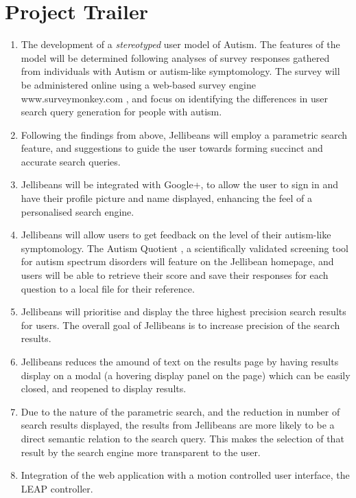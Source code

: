 \documentclass[a4paper, 11pt]{article}
\begin{document}
\section{Project Trailer}
\begin{enumerate}
\item{The development of a \textit{stereotyped} user model of Autism. The features of the model will be determined following analyses of survey responses gathered from individuals with Autism or autism-like symptomology. The survey will be administered online using a web-based survey engine www.surveymonkey.com \cite{surveymonkey}, and focus on identifying the differences in user search query generation for people with autism.}
\item{Following the findings from above, Jellibeans will employ a parametric search feature, and suggestions to guide the user towards forming succinct and accurate search queries.}
\item{Jellibeans will be integrated with Google+, to allow the user to sign in and have their profile picture and name displayed, enhancing the feel of a personalised search engine.}
\item{Jellibeans will allow users to get feedback on the level of their autism-like symptomology. The Autism Quotient \cite{Baron Cohen et al}, a scientifically validated screening tool for autism spectrum disorders will feature on the Jellibean homepage, and users will be able to retrieve their score and save their responses for each question to a local file for their reference.}
\item{Jellibeans will prioritise and display the three highest precision search results for users. The overall goal of Jellibeans is to increase precision of the search results.}
\item{Jellibeans reduces the amound of text on the results page by having results display on a modal (a hovering display panel on the page) which can be easily closed, and reopened to display results.}
\item{Due to the nature of the parametric search, and the reduction in number of search results displayed, the results from Jellibeans are more likely to be a direct semantic relation to the search query. This makes the selection of that result by the search engine more transparent to the user.}
\item{Integration of the web application with a motion controlled user interface, the LEAP controller.}
\end{enumerate}
\end{document}
